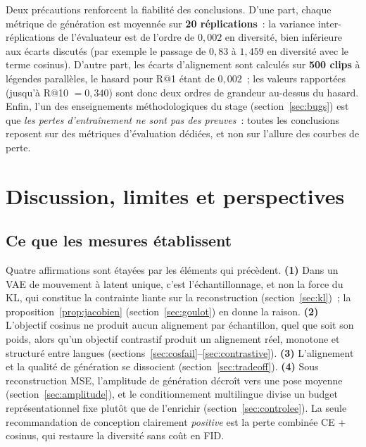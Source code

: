 \documentclass[12pt,a4paper,oneside]{report}
\theoremstyle{definition}
\theoremstyle{plain}
\begin{document}
Deux précautions renforcent la fiabilité des conclusions. D'une part, chaque
métrique de génération est moyennée sur \textbf{20 réplications}~: la variance
inter-réplications de l'évaluateur est de l'ordre de $0{,}002$ en diversité, bien
inférieure aux écarts discutés (par exemple le passage de $0{,}83$ à $1{,}459$ en
diversité avec le terme cosinus). D'autre part, les écarts d'alignement sont
calculés sur \textbf{500 clips} à légendes parallèles, le hasard pour R@1 étant de
$0{,}002$~; les valeurs rapportées (jusqu'à R@10 $=0{,}340$) sont donc deux ordres
de grandeur au-dessus du hasard. Enfin, l'un des enseignements méthodologiques du
stage (section~\ref{sec:bugs}) est que \emph{les pertes d'entraînement ne sont pas
des preuves}~: toutes les conclusions reposent sur des métriques d'évaluation
dédiées, et non sur l'allure des courbes de perte.

\chapter{Discussion, limites et perspectives}
\label{ch:discussion}

\section{Ce que les mesures établissent}

Quatre affirmations sont étayées par les éléments qui précèdent. \textbf{(1)} Dans
un VAE de mouvement à latent unique, c'est l'échantillonnage, et non la force du
KL, qui constitue la contrainte liante sur la reconstruction
(section~\ref{sec:kl})~; la proposition~\ref{prop:jacobien}
(section~\ref{sec:goulot}) en donne la raison. \textbf{(2)} L'objectif cosinus ne
produit aucun alignement par échantillon, quel que soit son poids, alors qu'un
objectif contrastif produit un alignement réel, monotone et structuré entre
langues (sections~\ref{sec:cosfail}--\ref{sec:contrastive}). \textbf{(3)}
L'alignement et la qualité de génération se dissocient (section~\ref{sec:tradeoff}).
\textbf{(4)} Sous reconstruction MSE, l'amplitude de génération décroît vers une
pose moyenne (section~\ref{sec:amplitude}), et le conditionnement multilingue
divise un budget représentationnel fixe plutôt que de l'enrichir
(section~\ref{sec:controlee}). La seule recommandation de conception clairement
\emph{positive} est la perte combinée CE + cosinus, qui restaure la diversité sans
coût en FID.
\end{document}
